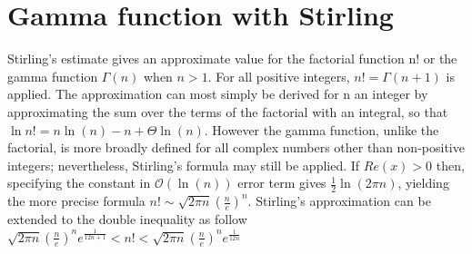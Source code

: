 \documentclass[a4paper, 11pt]{article}
\begin{document}
\section{Gamma function with Stirling}

Stirling's estimate gives an approximate value for the factorial function n! or the gamma function $\Gamma(n)$ when $n>1$. For all positive integers, ${\displaystyle n!=\Gamma (n+1)}$ is applied. The approximation can most simply be derived for n an integer by approximating the sum over the terms of the factorial with an integral, so that ${\displaystyle \ln n! = n \ln(n) - n + \Theta \ln(n)}$. However  the gamma function, unlike the factorial, is more broadly defined for all complex numbers other than non-positive integers; nevertheless, Stirling's formula may still be applied. If $Re(x) > 0$ then, specifying the constant in $\mathcal{O}(\ln(n))$ error term gives $\frac{1}{2}\ln(2\pi n)$, yielding the more precise formula $n! \sim \sqrt {2\pi n} (\frac{n}{e})^n$. Stirling's approximation can be extended to the double inequality as follow $\sqrt {2\pi n} (\frac{n}{e})^n  e^\frac{1}{12n + 1} < n! < \sqrt {2\pi n} (\frac{n}{e})^n  e^\frac{1}{12n}$ 
\end{document}
